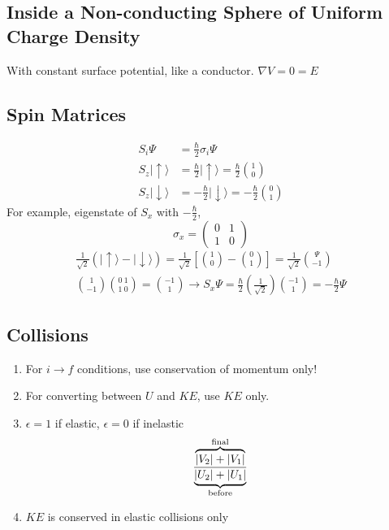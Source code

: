 \documentclass[10pt,a4paper]{article}
\begin{document}
\subsection{Inside a Non-conducting Sphere of Uniform Charge Density}
With constant surface potential, like a conductor. $\nabla V = 0 = E$

\subsection{Spin Matrices}
\begin{align}
S_i\Psi &= \frac{\hbar}{2}\sigma_i\Psi\\
S_z | \uparrow \rangle &= \frac{\hbar}{2} | \uparrow \rangle = \frac{\hbar}{2} \binom{1}{0}\\
S_z | \downarrow \rangle &= -\frac{\hbar}{2} | \downarrow \rangle = -\frac{\hbar}{2} \binom{0}{1}
\end{align}
For example, eigenstate of $S_x$ with $-\frac{\hbar}{2}$, 
\[ \sigma_x = \left( \begin{array}{cc}
0 & 1  \\
1 & 0  \end{array} \right)\]
\begin{align}
  \frac{1}{\sqrt{2}}(| \uparrow \rangle - | \downarrow \rangle) = \frac{1}{\sqrt{2}} \left[ \binom{1}{0} - \binom{0}{1}\right] = \frac{1}{\sqrt{2}} \binom{\Psi}{-1}\\
  \binom{1}{-1} \binom{0~1}{1~0} = \binom{-1}{1} \rightarrow S_x\Psi = \frac{\hbar}{2} \left( \frac{1}{\sqrt{2}}\right) \binom{-1}{1} = -\frac{\hbar}{2}\Psi
\end{align}

\subsection{Collisions}
\begin{enumerate}
    \item For $i \rightarrow f$ conditions, use conservation of momentum only!
    \item For converting between $U$ and $KE$, use $KE$ only.
    \item $\epsilon = 1$ if elastic, $\epsilon = 0$ if inelastic\\
    \begin{equation}
        \frac{\overbrace{|V_2| + |V_1|}^{ \mathclap{\textrm{final}}} } {\underbrace{|U_2| + |U_1|}_{ \mathclap{\textrm{before}} }}
    \end{equation}
    \item $KE$ is conserved in elastic collisions only
\end{enumerate}
\end{document}
